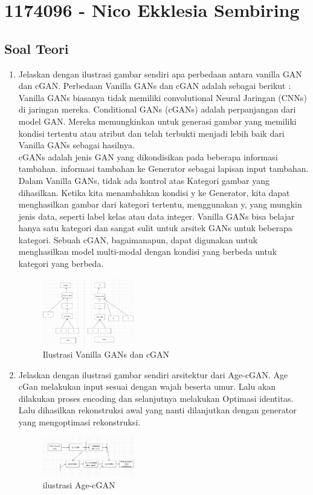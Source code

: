\section{1174096 - Nico Ekklesia Sembiring}
\subsection{Soal Teori}
\begin{enumerate}

	\item Jelaskan dengan ilustrasi gambar sendiri apa perbedaan antara vanilla GAN dan cGAN.
	\hfill\break
    Perbedaan Vanilla GANs dan cGAN adalah sebagai berikut :
    \hfill\break
    Vanilla GANs biasanya tidak memiliki convolutional Neural Jaringan (CNNs) di jaringan mereka.
    \hfill \break
    Conditional GANs (cGANs) adalah perpanjangan dari model GAN. Mereka memungkinkan untuk generasi gambar yang memiliki kondisi tertentu atau atribut dan telah terbukti menjadi lebih baik dari Vanilla GANs sebagai hasilnya. \\
    cGANs adalah jenis GAN yang dikondisikan pada beberapa informasi tambahan.  informasi tambahan ke Generator sebagai lapisan input tambahan. Dalam Vanilla GANs, tidak ada kontrol atas Kategori gambar yang dihasilkan. Ketika kita menambahkan kondisi y ke Generator, kita dapat menghasilkan gambar dari kategori tertentu, menggunakan y, yang mungkin jenis data, seperti label kelas atau data integer. Vanilla GANs bisa belajar hanya satu kategori dan sangat sulit untuk arsitek GANs untuk beberapa kategori. Sebuah cGAN, bagaimanapun, dapat digunakan untuk menghasilkan model multi-modal dengan kondisi yang berbeda untuk kategori yang berbeda.
    \hfill \break
    \begin{figure}[H]
	\centering
		\includegraphics[width=4cm]{figures/1174096/tugas9/teori1.PNG}
		\caption{Ilustrasi Vanilla GANs dan cGAN}
	\end{figure}

	\item Jelaskan dengan ilustrasi gambar sendiri arsitektur dari Age-cGAN.
    \hfill\break
    Age cGan melakukan input sesuai dengan wajah beserta umur. Lalu akan dilakukan proses encoding dan selanjutnya melakukan Optimasi identitas. Lalu dihasilkan rekonstruksi awal yang nanti dilanjutkan dengan generator yang mengoptimasi rekonstruksi.
    \begin{figure}[H]
	\centering
		\includegraphics[width=4cm]{figures/1174096/tugas9/teori2.PNG}
		\caption{ilustrasi Age-cGAN}
	\end{figure}


\end{enumerate}
